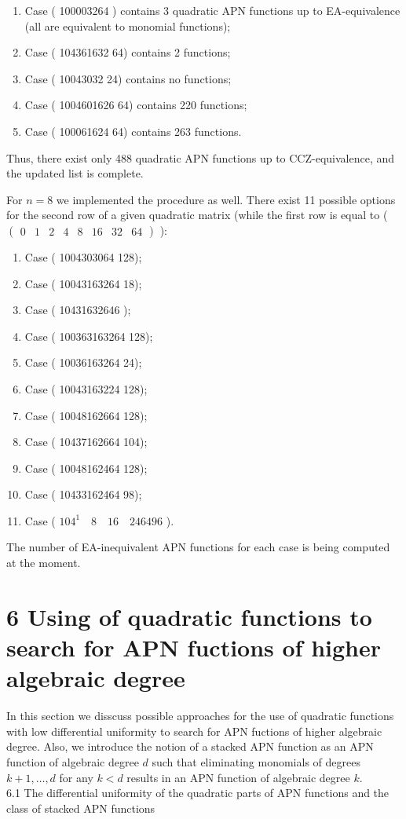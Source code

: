 \documentclass[10pt]{article}
\begin{document}
\begin{enumerate}
  \item Case ( 100003264 ) contains 3 quadratic APN functions up to EA-equivalence (all are equivalent to monomial functions);
  \item Case ( 104361632 64) contains 2 functions;
  \item Case ( 10043032 24) contains no functions;
  \item Case ( 1004601626 64) contains 220 functions;
  \item Case ( 100061624 64) contains 263 functions.
\end{enumerate}

Thus, there exist only 488 quadratic APN functions up to CCZ-equivalence, and the updated list is complete.

For $n=8$ we implemented the procedure as well. There exist 11 possible options for the second row of a given quadratic matrix (while the first row is equal to ( $\left(\begin{array}{llllllll}0 & 1 & 2 & 4 & 8 & 16 & 32 & 64\end{array}\right)$ ):

\begin{enumerate}
  \item Case ( 1004303064 128);
  \item Case ( 10043163264 18);
  \item Case ( 10431632646 );
  \item Case ( 100363163264 128);
  \item Case ( 10036163264 24);
  \item Case ( 10043163224 128);
  \item Case ( 10048162664 128);
  \item Case ( 10437162664 104);
  \item Case ( 10048162464 128);
  \item Case ( 10433162464 98);
  \item Case ( $104^{1} \quad 8 \quad 16 \quad 246496$ ).
\end{enumerate}

The number of EA-inequivalent APN functions for each case is being computed at the moment.

\section*{6 Using of quadratic functions to search for APN fuctions of higher algebraic degree}
In this section we disscuss possible approaches for the use of quadratic functions with low differential uniformity to search for APN fuctions of higher algebraic degree. Also, we introduce the notion of a stacked APN function as an APN function of algebraic degree $d$ such that eliminating monomials of degrees $k+1, \ldots, d$ for any $k<d$ results in an APN function of algebraic degree $k$.\\
6.1 The differential uniformity of the quadratic parts of APN functions and the class of stacked APN functions
\end{document}
